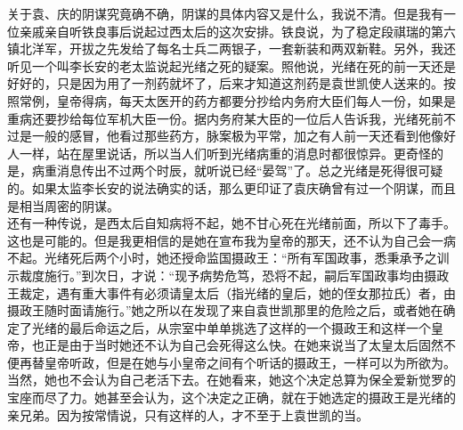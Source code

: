 关于袁、庆的阴谋究竟确不确，阴谋的具体内容又是什么，我说不清。但是我有一位亲戚亲自听铁良事后说起过西太后的这次安排。铁良说，为了稳定段祺瑞的第六镇北洋军，开拔之先发给了每名士兵二两银子，一套新装和两双新鞋。另外，我还听见一个叫李长安的老太监说起光绪之死的疑案。照他说，光绪在死的前一天还是好好的，只是因为用了一剂药就坏了，后来才知道这剂药是袁世凯使人送来的。按照常例，皇帝得病，每天太医开的药方都要分抄给内务府大臣们每人一份，如果是重病还要抄给每位军机大臣一份。据内务府某大臣的一位后人告诉我，光绪死前不过是一般的感冒，他看过那些药方，脉案极为平常，加之有人前一天还看到他像好人一样，站在屋里说话，所以当人们听到光绪病重的消息时都很惊异。更奇怪的是，病重消息传出不过两个时辰，就听说已经“晏驾”了。总之光绪是死得很可疑的。如果太监李长安的说法确实的话，那么更印证了袁庆确曾有过一个阴谋，而且是相当周密的阴谋。\\

还有一种传说，是西太后自知病将不起，她不甘心死在光绪前面，所以下了毒手。这也是可能的。但是我更相信的是她在宣布我为皇帝的那天，还不认为自己会一病不起。光绪死后两个小时，她还授命监国摄政王：“所有军国政事，悉秉承予之训示裁度施行。”到次日，才说：“现予病势危笃，恐将不起，嗣后军国政事均由摄政王裁定，遇有重大事件有必须请皇太后（指光绪的皇后，她的侄女那拉氏）者，由摄政王随时面请施行。”她之所以在发现了来自袁世凯那里的危险之后，或者她在确定了光绪的最后命运之后，从宗室中单单挑选了这样的一个摄政王和这样一个皇帝，也正是由于当时她还不认为自己会死得这么快。在她来说当了太皇太后固然不便再替皇帝听政，但是在她与小皇帝之间有个听话的摄政王，一样可以为所欲为。\\

当然，她也不会认为自己老活下去。在她看来，她这个决定总算为保全爱新觉罗的宝座而尽了力。她甚至会认为，这个决定之正确，就在于她选定的摄政王是光绪的亲兄弟。因为按常情说，只有这样的人，才不至于上袁世凯的当。
